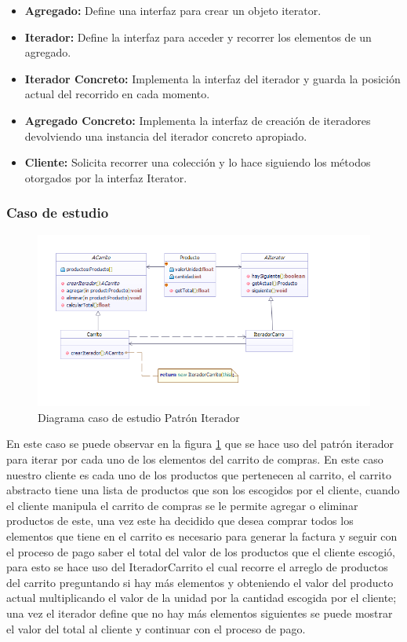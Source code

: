 \begin{itemize}
	\item \textbf{Agregado: }Define una interfaz para crear un objeto iterator.
	\item \textbf{Iterador: }Define la interfaz para acceder y recorrer los elementos de un agregado.
	\item \textbf{Iterador Concreto: }Implementa la interfaz del iterador y guarda la posición actual del recorrido en cada momento.
	\item \textbf{Agregado Concreto: }Implementa la interfaz de creación de iteradores devolviendo una instancia del iterador concreto apropiado.
	\item \textbf{Cliente: }Solicita recorrer una colección y lo hace siguiendo los métodos otorgados por la interfaz Iterator. 
\end{itemize}

\subsubsection{Caso de estudio}

\begin{figure}[th!]
	\centering
	\includegraphics[width=0.9\linewidth]{arquitectura/imagenes/DiagramaIterador}
	\caption{Diagrama caso de estudio Patrón Iterador}
	\label{fig:patronIterador}
\end{figure}

En este caso se puede observar en la figura \ref{fig:patronIterador} que se hace uso del patrón iterador para iterar por cada uno de los elementos del carrito de compras. En este caso nuestro cliente es cada uno de los productos que pertenecen al carrito, el carrito abstracto tiene una lista de productos que son los escogidos por el cliente, cuando el cliente manipula el carrito de compras se le permite agregar o eliminar productos de este, una vez este ha decidido que desea comprar todos los elementos que tiene en el carrito es necesario para generar la factura y seguir con el proceso de pago saber el total del valor de los productos que el cliente escogió, para esto se hace uso del IteradorCarrito  el cual recorre el arreglo de productos del carrito preguntando si hay más elementos y obteniendo el valor del producto actual multiplicando el valor de la unidad por la cantidad escogida por el cliente; una vez el iterador define que no hay más elementos siguientes se puede mostrar el valor del total al cliente y continuar con el proceso de pago.




